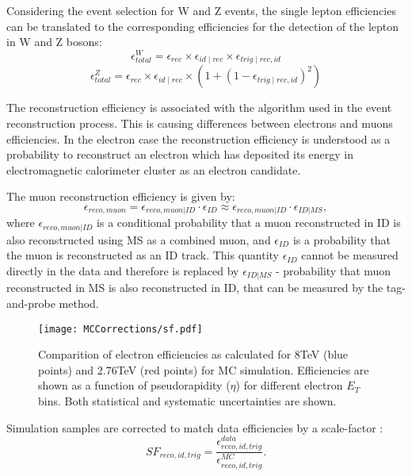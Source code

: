 Considering the event selection for W and Z events, the single lepton efficiencies can be translated to the corresponding efficiencies for the  detection of the lepton in W and Z bosons:
\begin{equation}
\epsilon^{W}_{total}=\epsilon_{rec} \times \epsilon_{id \mid rec} \times \epsilon_{trig \mid rec,id}
\end{equation}
\begin{equation}
\epsilon^{Z}_{total}=\epsilon_{rec} \times \epsilon_{id \mid rec} \times (1+(1-\epsilon_{trig \mid rec,id})^2)
\end{equation}

The reconstruction efficiency is associated with the algorithm used in the event reconstruction process. This is causing differences between electrons and muons efficiencies. In the electron case the reconstruction efficiency is understood as a probability to reconstruct an electron which has deposited its energy in electromagnetic calorimeter cluster as an electron candidate.  

The muon reconstruction efficiency is given by:
\begin{equation}
\epsilon_{reco,muon} = \epsilon_{reco,muon|ID} \cdot \epsilon_{ID} \approx \epsilon_{reco,muon|ID} \cdot \epsilon_{ID|MS},
\end{equation}
where $\epsilon_{reco,muon|ID}$ is a conditional probability that a muon reconstructed in ID is also reconstructed using MS as a combined muon, and  $\epsilon_{ID}$ is a probability that the muon is reconstructed as an ID track. This quantity $\epsilon_{ID}$ cannot be measured directly  in the data and therefore is replaced by $\epsilon_{ID|MS}$ - probability that muon reconstructed in MS is also reconstructed in ID, that can be measured by the tag-and-probe method. 



\begin{figure}[!tbp]
\centering
\texttt{[image: MCCorrections/sf.pdf]}
\caption{Comparition of electron efficiencies as calculated for 8TeV (blue points) and 2.76TeV (red points) for MC simulation. Efficiencies are shown as a function of pseudorapidity ($\eta$) for different electron $E_T$ bins. Both statistical and systematic uncertainties are shown. \cite{ElecEff}}
\label{eff_comp}
\end{figure}

Simulation samples are corrected to match data efficiencies by a scale-factor :
\begin{equation}
SF_{reco,id,trig}=\frac{\epsilon^{data}_{reco,id,trig}}{\epsilon^{MC}_{reco,id,trig}}.
\end{equation}

